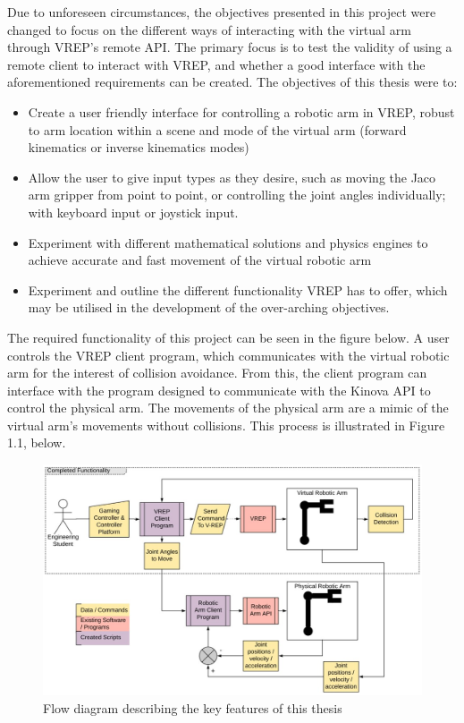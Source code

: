 \documentclass[12pt,openany,a4paper]{book}
\begin{document}
Due to unforeseen circumstances, the objectives presented in this project were changed to focus on the different ways of interacting with the virtual arm through VREP's remote API. The primary focus is to test the validity of using a remote client to interact with VREP, and whether a good interface with the aforementioned requirements can be created. The objectives of this thesis were to:

\begin{itemize}
	\item Create a user friendly interface for controlling a robotic arm in VREP, robust to arm location within a scene and mode of the virtual arm (forward kinematics or inverse kinematics modes)
	\item Allow the user to give input types as they desire, such as moving the Jaco arm gripper from point to point, or controlling the joint angles individually; with keyboard input or joystick input.
	\item Experiment with different mathematical solutions and physics engines to achieve accurate and fast movement of the virtual robotic arm
	\item Experiment and outline the different functionality VREP has to offer, which may be utilised in the development of the over-arching objectives.
\end{itemize}

The required functionality of this project can be seen in the figure below. A user controls the VREP client program, which communicates with the virtual robotic arm for the interest of collision avoidance. From this, the client program can interface with the program designed to communicate with the Kinova API to control the physical arm. The movements of the physical arm are a mimic of the virtual arm's movements without collisions. This process is illustrated in Figure 1.1, below.


\begin{center}
\begin{figure}[htb]
  \includegraphics[width=1.12\linewidth]{Thesis_flow_chart.jpg}
\caption{Flow diagram describing the key features of this thesis}
\end{figure}
\end{center}
\end{document}
